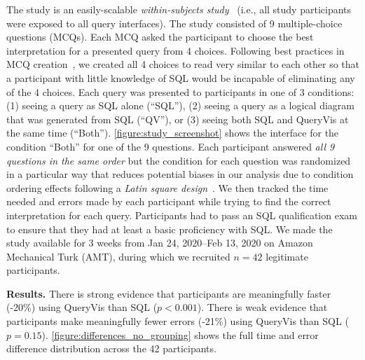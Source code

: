 \documentclass[letterpaper,11pt]{article}
\newcommand{\queryvis}{\textsf{QueryVis}\xspace}
\newcommand{\introparagraph}[1]{\textbf{#1.}}        %
\begin{document}
The study is an easily-scalable \emph{within-subjects study}~\cite{seltman2012experimental} 
(i.e., all study participants were exposed to all query interfaces).
%
%
%
The study consisted of 9 multiple-choice questions (MCQs).
Each MCQ asked the participant to choose the best interpretation for a presented query from 4 choices.
Following best practices in MCQ creation~\cite{Zimmaro2010},
we created all 4 choices to read very similar to each other so that a participant with little knowledge of SQL would be incapable of eliminating any of the 4 choices.
Each query was presented to participants in one of 3 conditions: 
(1) seeing a query as SQL alone (``SQL''), 
(2) seeing a query as a logical diagram that was generated from SQL (``QV''), or 
(3) seeing both SQL and \queryvis at the same time (``Both'').
\autoref{figure:study_screenshot} shows the interface for the condition ``Both'' for one of the 9 questions.
Each participant answered \emph{all 9 questions in the same order} but
the condition for each question was 
randomized in a particular way that reduces potential biases in our analysis due to condition ordering effects
following a \emph{Latin square design}~\cite{Ledolter:2007fu,Montgomery:2013wq}.
We then tracked the time needed and errors made by each participant while trying to find the correct interpretation for each query.
%
%
%
Participants had to pass an SQL qualification exam to ensure that they had at least a basic proficiency with SQL.
We made the study available for 3 weeks from Jan 24, 2020--Feb 13, 2020 on Amazon Mechanical Turk (AMT),
during  which we recruited $n = 42$ legitimate participants.


\introparagraph{Results}
There is strong evidence that participants are meaningfully faster (-20\%) using \queryvis than {SQL} 
($p<0.001$). 
There is weak evidence that participants make meaningfully fewer errors (-21\%) using \queryvis than {SQL}
($p=0.15$).
\autoref{figure:differences_no_grouping}
shows the full time and error difference distribution across the 42 participants.
\end{document}
